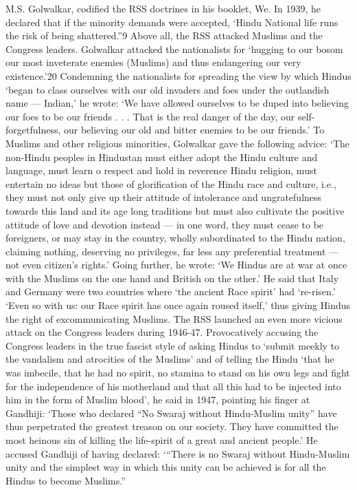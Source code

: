 M.S. Golwalkar, codified the RSS doctrines in his booklet, We. In 1939, he declared that if the minority demands were accepted, ‘Hindu National life runs the risk of being shattered.”9 Above all, the RSS attacked Muslims and the Congress leaders. Golwalkar attacked the nationalists for ‘hugging to our bosom our most inveterate enemies (Muslims) and thus endangering our very existence.’20 Condemning the nationalists for spreading the view by which Hindus ‘began to class ourselves with our old invaders and foes under the outlandish name — Indian,’ he wrote: ‘We have allowed ourselves to be duped into believing our foes to be our friends . . . That is the real danger of the day, our self- forgetfulness, our believing our old and bitter enemies to be our friends.’ To Muslims and other religious minorities, Golwalkar gave the following advice: ‘The non-Hindu peoples in Hindustan must either adopt the Hindu culture and language, must learn o respect and hold in reverence Hindu religion, must entertain no ideas but those of glorification of the Hindu race and culture, i.e., they must not only give up their attitude of intolerance and ungratefulness towards this land and its age long traditions but must also cultivate the positive attitude of love and devotion instead — in one word, they must cease to be foreigners, or may stay in the country, wholly subordinated to the Hindu nation, claiming nothing, deserving no privileges, far less any preferential treatment — not even citizen’s rights.’ Going further, he wrote: ‘We Hindus are at war at once with the Muslims on the one hand and British on the other.’ He said that Italy and Germany were two countries where ‘the ancient Race spirit’ had ‘re-risen.’ ‘Even so with us: our Race spirit has once again roused itself,’ thus giving Hindus the right of excommunicating Muslims. The RSS launched an even more vicious attack on the Congress leaders during 1946-47. Provocatively accusing the Congress leaders in the true fascist style of asking Hindus to ‘submit meekly to the vandalism and atrocities of the Muslims’ and of telling the Hindu ‘that he was imbecile, that he had no spirit, no stamina to stand on his own legs and fight for the independence of his motherland and that all this had to be injected into him in the form of Muslim blood’, he said in 1947, pointing his finger at Gandhiji: ‘Those who declared “No Swaraj without Hindu-Muslim unity” have thus perpetrated the greatest treason on our society. They have committed the most heinous sin of killing the life-spirit of a great and ancient people.’ He accused Gandhiji of having declared: ‘“There is no Swaraj without Hindu-Muslim unity and the simplest way in which this unity can be achieved is for all the Hindus to become Muslims.” 

